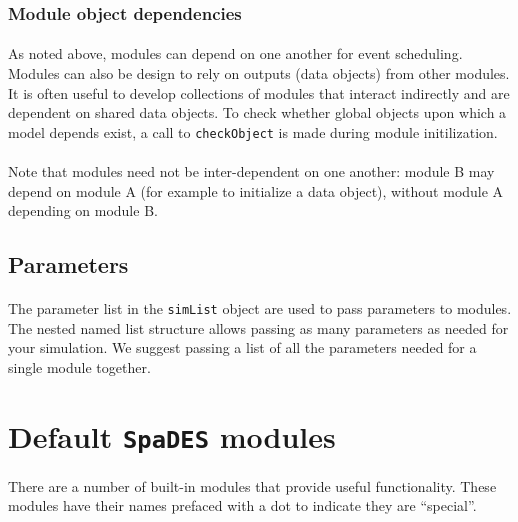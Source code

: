 \documentclass{article}
\begin{document}
\subsubsection{Module object dependencies}

\paragraph{} %
As noted above, modules can depend on one another for event scheduling. Modules can also be design to rely on outputs (data objects) from other modules.  It is often useful to develop collections of modules that interact indirectly and are dependent on shared data objects. To check whether global objects upon which a model depends exist, a call to \texttt{checkObject} is made during module initilization.

\paragraph{}
Note that modules need not be inter-dependent on one another: module B may depend on module A (for example to initialize a data object), without module A depending on module B.

\subsection{Parameters}

\paragraph{}
The parameter list in the \texttt{simList} object are used to pass parameters to modules. The nested named list structure allows passing as many parameters as needed for your simulation. We suggest passing a list of all the parameters needed for a single module together.

\newpage

\section{Default \texttt{SpaDES} modules}

\paragraph{}
There are a number of built-in modules that provide useful functionality. These modules have their names prefaced with a dot to indicate they are ``special''.
\end{document}
